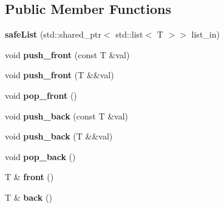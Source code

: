 \subsection*{Public Member Functions}
\begin{DoxyCompactItemize}
\item 
\mbox{\label{classSafeContainers_1_1safeList_a351b6f4a2ad6fc8055fddc21f41617a2}} 
{\bfseries safe\+List} (std\+::shared\+\_\+ptr$<$ std\+::list$<$ T $>$$>$ list\+\_\+in)
\item 
\mbox{\label{classSafeContainers_1_1safeList_a25a4f869326a2e14e268a73de22a6902}} 
void {\bfseries push\+\_\+front} (const T \&val)
\item 
\mbox{\label{classSafeContainers_1_1safeList_aa475c5bf39b96376b2155bd4334edced}} 
void {\bfseries push\+\_\+front} (T \&\&val)
\item 
\mbox{\label{classSafeContainers_1_1safeList_abc97b786b314a26cfce8824b7e33af6f}} 
void {\bfseries pop\+\_\+front} ()
\item 
\mbox{\label{classSafeContainers_1_1safeList_abbf387e257f1aa1dc5226ed92041068e}} 
void {\bfseries push\+\_\+back} (const T \&val)
\item 
\mbox{\label{classSafeContainers_1_1safeList_ac8f3fcbe71961127dff12ca57a4bdcff}} 
void {\bfseries push\+\_\+back} (T \&\&val)
\item 
\mbox{\label{classSafeContainers_1_1safeList_af99f2d025cb5a5717a4df712bfa9995e}} 
void {\bfseries pop\+\_\+back} ()
\item 
\mbox{\label{classSafeContainers_1_1safeList_aa895e153bfd1a93226b09b8a3dcd14de}} 
T \& {\bfseries front} ()
\item 
\mbox{\label{classSafeContainers_1_1safeList_a84cfd0d0b35c43d37401c78578f2bda1}} 
T \& {\bfseries back} ()
\item 
\mbox{\label{classSafeContainers_1_1safeList_ae9e3c2fc600a6337afb89454e0c52e1e}} 
$$
\end{DoxyCompactItemize}
